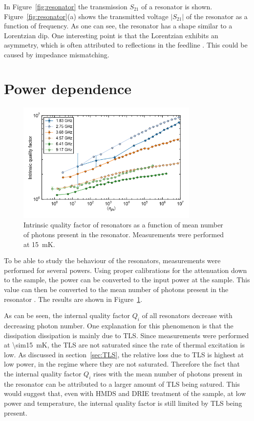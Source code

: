  In Figure~\ref{fig:resonator} the transmission $S_{21}$ of a resonator is shown. Figure~\ref{fig:resonator}(a) shows the transmitted voltage $|S_{21}|$ of the resonator as a function of frequency. As one can see, the resonator has a shape similar to a Lorentzian dip. One interesting point is that the Lorentzian exhibits an asymmetry, which is often attributed to reflections in the feedline \cite[p192]{Geerlings}. This could be caused by impedance mismatching.


\section{Power dependence}
\label{sec:resonator:results:power_dependence}

\begin{figure}
    \centering
    \includegraphics[width=0.8\textwidth]{Figures/DRIE/Qi_vs_n_photon.png}
    \caption{Intrinsic quality factor of resonators as a function of mean number of photons present in the resonator. Measurements were performed at \SI{15}{\milli \kelvin}.}
    \label{fig:Qi_vs_n_photon}
\end{figure}
To be able to study the behaviour of the resonators, measurements were performed for several powers. Using proper calibrations for the attenuation down to the sample, the power can be converted to the input power at the sample. This value can then be converted to the mean number of photons present in the resonator \cite{DRIE}. The results are shown in Figure~\ref{fig:Qi_vs_n_photon}.

As can be seen, the internal quality factor $Q_i$ of all resonators decrease with decreasing photon number. One explanation for this phenomenon is that the dissipation dissipation is mainly due to TLS. Since measurements were performed at \SI{\sim15}{mK}, the TLS are not saturated since the rate of thermal excitation is low. As discussed in section~\ref{sec:TLS}, the relative loss due to TLS is highest at low power, in the regime where they are not saturated. Therefore the fact that the internal quality factor $Q_i$ rises with the mean number of photons present in the resonator can be attributed to a larger amount of TLS being satured. This would suggest that, even with HMDS and DRIE treatment of the sample, at low power and temperature, the internal quality factor is still limited by TLS being present.


